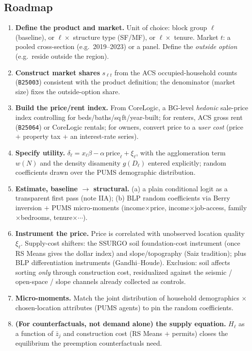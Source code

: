 \documentclass[11pt]{article}
\begin{document}
\subsection{Roadmap}
\begin{enumerate}[leftmargin=1.6em, itemsep=1.5pt]
\item \textbf{Define the product and market.} Unit of choice: block group $\ell$ (baseline), or
  $\ell\times$ structure type (SF/MF), or $\ell\times$ tenure. Market $t$: a pooled cross-section
  (e.g.\ 2019--2023) or a panel. Define the \emph{outside option} (e.g.\ reside outside the region).
\item \textbf{Construct market shares} $s_{\ell t}$ from the ACS occupied-household counts
  (\texttt{B25003}) consistent with the product definition; the denominator (market size) fixes the
  outside-option share.
\item \textbf{Build the price/rent index.} From CoreLogic, a BG-level \emph{hedonic} sale-price
  index controlling for beds/baths/sq\,ft/year-built; for renters, ACS gross rent (\texttt{B25064})
  or CoreLogic rentals; for owners, convert price to a \emph{user cost} (price $+$ property tax $+$
  an interest-rate series).
\item \textbf{Specify utility.} $\delta_\ell = x_\ell\beta - \alpha\,\text{price}_\ell + \xi_\ell$,
  with the agglomeration term $w(N)$ and the density disamenity $g(D_\ell)$ entered explicitly;
  random coefficients drawn over the PUMS demographic distribution.
\item \textbf{Estimate, baseline $\to$ structural.} (a) a plain conditional logit as a transparent
  first pass (note IIA); (b) BLP random coefficients via Berry inversion $+$ PUMS micro-moments
  (income$\times$price, income$\times$job-access, family$\times$bedrooms, tenure$\times\cdots$).
\item \textbf{Instrument the price.} Price is correlated with unobserved location quality $\xi_\ell$.
  Supply-cost shifters: the SSURGO soil foundation-cost instrument (once RS Means gives the dollar
  index) and slope/topography (Saiz tradition); plus BLP differentiation instruments
  (Gandhi--Houde). Exclusion: soil affects sorting \emph{only} through construction cost,
  residualized against the seismic / open-space / slope channels already collected as controls.
\item \textbf{Micro-moments.} Match the joint distribution of household demographics $\times$
  chosen-location attributes (PUMS agents) to pin the random coefficients.
\item \textbf{(For counterfactuals, not demand alone) the supply equation.} $H_\ell$ as a function
  of $\bar z_j$ and construction cost (RS Means $+$ permits) closes the equilibrium the preemption
  counterfactuals need.
\end{enumerate}
\end{document}
